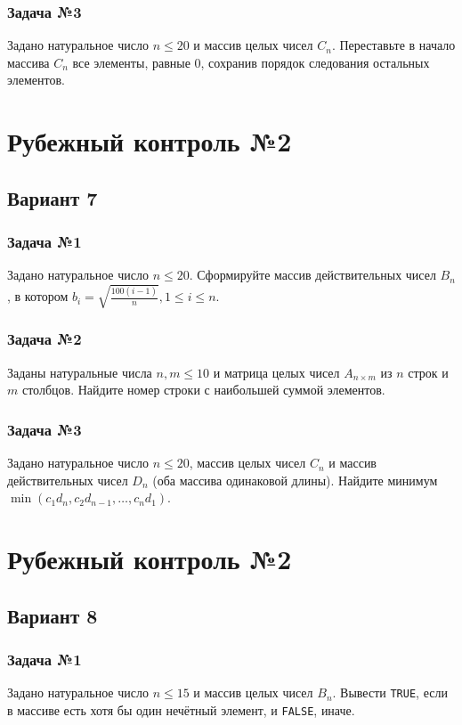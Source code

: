 \documentclass[12pt,a5paper,landscape]{report}
\begin{document}
\subsubsection*{Задача №3}
Задано натуральное число $n \le 20$ и массив целых чисел $C_n$. Переставьте в начало массива $C_n$ все элементы, равные $0$, сохранив порядок следования остальных элементов.


\clearpage
\section*{Рубежный контроль №2}
\subsection*{Вариант 7}
\subsubsection*{Задача №1}
Задано натуральное число $n \le 20$. Сформируйте массив действительных чисел $B_n$, в котором $b_i = \sqrt { \frac {100 (i-1)} {n} }, 1 \le i \le n$.
\subsubsection*{Задача №2}
Заданы натуральные числа $n, m \le 10$ и матрица целых чисел $A_{n \times m}$ из $n$ строк и $m$ столбцов. Найдите номер строки с наибольшей суммой элементов.
\subsubsection*{Задача №3}
Задано натуральное число $n \le 20$, массив целых чисел $C_n$ и массив действительных чисел $D_n$ (оба массива одинаковой длины). Найдите минимум $\min({ c_1 d_n, c_2 d_{n-1}, \ldots, c_n d_1 })$.


\clearpage
\section*{Рубежный контроль №2}
\subsection*{Вариант 8}
\subsubsection*{Задача №1}
Задано натуральное число $n \le 15$ и массив целых чисел $B_n$. Вывести \texttt{TRUE}, если в массиве есть хотя бы один нечётный элемент, и \texttt{FALSE}, иначе.
\end{document}
